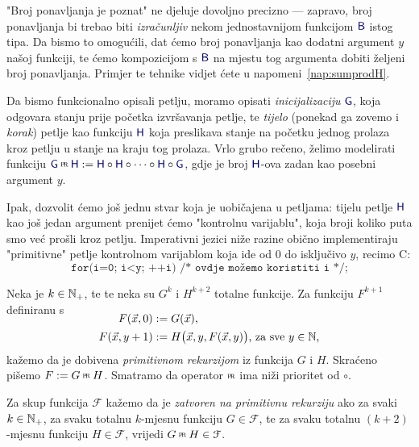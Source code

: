 "Broj ponavljanja je poznat" ne djeluje dovoljno precizno --- zapravo, broj ponavljanja bi trebao biti \emph{izračunljiv} nekom jednostavnijom funkcijom $\f B$ istog tipa. 
Da bismo to omogućili, dat ćemo broj ponavljanja kao dodatni argument $y$ našoj funkciji, te ćemo kompozicijom s $\f B$ na mjestu tog argumenta dobiti željeni broj ponavljanja. Primjer te tehnike vidjet ćete u napomeni~\ref{nap:sumprodH}.

Da bismo funkcionalno opisali petlju, moramo opisati \emph{inicijalizaciju} $\f G$, koja odgovara stanju prije početka izvršavanja petlje, te \emph{tijelo} (ponekad ga zovemo i \emph{korak}) petlje kao funkciju $\f H$ koja preslikava stanje na početku jednog prolaza kroz petlju u stanje na kraju tog prolaza. Vrlo grubo rečeno, želimo modelirati funkciju $\f G\pr\f H:=\f H\circ\f H\circ\dotsb\circ\f  H\circ\f G$, gdje je broj $\f H$-ova zadan kao posebni argument $y$.

Ipak, dozvolit ćemo još jednu stvar koja je uobičajena u petljama: tijelu petlje $\f H$ kao još jedan argument prenijet ćemo "kontrolnu varijablu", koja broji koliko puta smo već prošli kroz petlju. Imperativni jezici niže razine obično implementiraju "primitivne" petlje kontrolnom varijablom koja ide od $0$ do isključivo $y$, recimo C:
\begin{equation}\label{prog:Cprloop}
\texttt{for(i=0; i<y; ++i) /* ovdje možemo koristiti i */;}
\end{equation}


\begin{definicija}[{name=[primitivna rekurzija]}]\label{def:pr}
Neka je $k\in{\mathbb N}_+$, te te neka su $G^k$ i $H^{k+2}$ totalne funkcije. Za funkciju $F^{k+1}$ definiranu s
\begin{align}
\SwapAboveDisplaySkip
\label{eq:defprb}
F(\vec x,0)&:=G(\vec x)\text,\\
\label{eq:defprk}
F(\vec x,y+1)&:=H\bigl(\vec x,y,F(\vec x,y)\bigr)\text{, za sve $y\in\N$,}
\end{align}
kažemo da je dobivena \emph{primitivnom rekurzijom} iz funkcija $G$ i $H$. Skraćeno pišemo $F:=G\pr H$. Smatramo da operator $\pr$ ima niži prioritet od $\circ$.

Za skup funkcija $\mathcal F$ kažemo da je \emph{zatvoren na primitivnu rekurziju} ako za svaki $k\in{\mathbb N}_+$, za svaku totalnu $k$-mjesnu funkciju $G\in\mathcal F$, te za svaku totalnu $(k+2)$-mjesnu funkciju $H\in\mathcal F$, vrijedi $G\pr H\in\mathcal F$.
\end{definicija}

